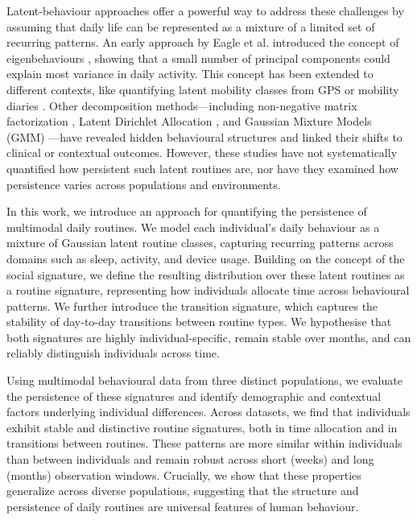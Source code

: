 \documentclass[pdflatex,sn-vancouver,Numbered]{bst/sn-jnl}%
\theoremstyle{thmstyleone}%
\theoremstyle{thmstyletwo}%
\theoremstyle{thmstylethree}%
\begin{document}
Latent-behaviour approaches offer a powerful way to address these challenges by assuming that daily life can be represented as a mixture of a limited set of recurring patterns. An early approach by Eagle et al. introduced the concept of eigenbehaviours \cite{eagleEigenbehaviorsIdentifyingStructure2009a}, showing that a small number of principal components could explain most variance in daily activity. This concept has been extended to different contexts, like quantifying latent mobility classes from GPS or mobility diaries \cite{jiangClusteringDailyPatterns2012, yangIdentifyingLatentActivity2023a}. Other decomposition methods—including non-negative matrix factorization \cite{aledavood2022quantifying, girardiniAdaptationStudentBehavioural2023a}, Latent Dirichlet Allocation \cite{farrahiDiscoveringRoutinesLargescale2011, farrahiWhatDidYou2008}, and Gaussian Mixture Models (GMM) \cite{zhou2022predicting, yan2025relapse}—have revealed hidden behavioural structures and linked their shifts to clinical or contextual outcomes. However, these studies have not systematically quantified how persistent such latent routines are, nor have they examined how persistence varies across populations and environments.

In this work, we introduce an approach for quantifying the persistence of multimodal daily routines. We model each individual’s daily behaviour as a mixture of Gaussian latent routine classes, capturing recurring patterns across domains such as sleep, activity, and device usage. Building on the concept of the social signature, we define the resulting distribution over these latent routines as a routine signature, representing how individuals allocate time across behavioural patterns. We further introduce the transition signature, which captures the stability of day-to-day transitions between routine types. We hypothesise that both signatures are highly individual-specific, remain stable over months, and can reliably distinguish individuals across time.

Using multimodal behavioural data from three distinct populations, we evaluate the persistence of these signatures and identify demographic and contextual factors underlying individual differences. Across datasets, we find that individuals exhibit stable and distinctive routine signatures, both in time allocation and in transitions between routines. These patterns are more similar within individuals than between individuals and remain robust across short (weeks) and long (months) observation windows. Crucially, we show that these properties generalize across diverse populations, suggesting that the structure and persistence of daily routines are universal features of human behaviour.
\end{document}
